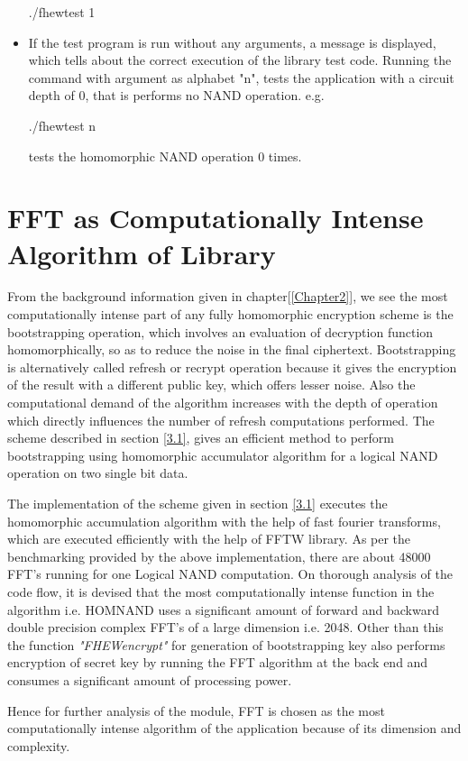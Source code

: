 \begin{itemize}
\hspace{3cm}
./fhewtest 1
\item
If the test program is run without any arguments, a message is displayed, which tells about the correct execution of the library test code. Running the command with argument as alphabet "n", tests the application with a circuit depth of 0, that is performs no NAND operation. e.g.

\hspace{3cm}
./fhewtest n

tests the homomorphic NAND operation 0 times.
\end{itemize}
\section{FFT as Computationally Intense Algorithm of Library}
From the background information given in chapter[\ref{Chapter2}], we see the most computationally intense part of any fully homomorphic encryption scheme is the bootstrapping operation, which involves an evaluation of decryption function homomorphically, so as to reduce the noise in the final ciphertext. Bootstrapping is alternatively called refresh or recrypt operation because it gives the encryption of the result with a different public key, which offers lesser noise. Also the computational demand of the algorithm increases with the depth of operation which directly influences the number of refresh computations performed. The scheme described in section {\ref{3.1}}, gives an efficient method to perform bootstrapping using homomorphic accumulator algorithm for a logical NAND operation on two single bit data. 

The implementation of the scheme given in section {\ref{3.1}} executes the homomorphic accumulation algorithm with the help of fast fourier transforms, which are executed efficiently with the help of FFTW library. As per the benchmarking provided by the above implementation, there are about 48000 FFT's running for one Logical NAND computation. On thorough analysis of the code flow, it is devised that the most computationally intense function in the algorithm i.e. HOMNAND uses a significant amount of forward and backward double precision complex FFT's of a large dimension i.e. 2048. Other than this the function \textit{"FHEWencrypt"} for generation of bootstrapping key also performs encryption of secret key by running the FFT algorithm at the back end and consumes a significant amount of processing power.

Hence for further analysis of the module, FFT is chosen as the most computationally intense algorithm of the application because of its dimension and complexity.
